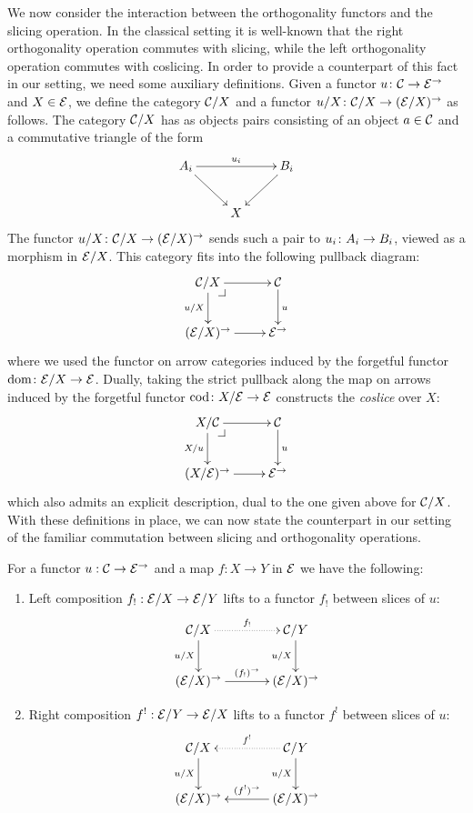 \documentclass[reqno,10pt,a4paper,oneside]{amsart}
\begin{document}
We now consider the interaction between the orthogonality functors and the slicing operation. In the classical setting it is well-known that the right orthogonality operation commutes with slicing, while the left orthogonality operation commutes with coslicing.  In order to provide a counterpart of this fact in our setting, we need some auxiliary definitions. Given a functor $u \co \cal{C} \to \catE^{\to}$ and $X \in \catE$, we define the category $\cal{C}/X$
and a functor $u/X \co \cal{C}/X \to (\cal{E}/X)^\to$ as follows. The category $\cal{C}/X$ has as objects pairs consisting of an object $a \in \cal{C}$ and a commutative triangle of the form
\[
\xymatrix{
A_i \ar[dr] \ar[rr]^{u_i} & & B_i \ar[dl] \\
 & X }
 \]
The functor $u/X \co \cal{C}/X \to (\cal{E}/X)^\to$ sends such a pair to $u_i \co A_i \to B_i$, viewed as a morphism in $\cal{E}/X$. This category fits into the
following pullback diagram:
\[
\xymatrix{
  \cal{C}/X
  \ar[r]
  \ar[d]_{u/X}
  \pullback{dr}
&
  \cal{C}
  \ar[d]^{u}
\\
  (\catE/X)^{\to}
  \ar[r]
&
  \catE^{\to}
}
\]
where we used the functor on arrow categories induced by the forgetful functor $\operatorname{dom} \co \catE/X \to \catE$.  Dually, taking the strict pullback along the map on arrows induced by the forgetful functor 
$\operatorname{cod} \co X/\cal{E} \to \catE$ constructs the \emph{coslice} over $X$:
\[
\xymatrix{
  X/\cal{C}
  \ar[r]
  \ar[d]_{X/u}
  \pullback{dr}
&
  \cal{C}
  \ar[d]^{u}
\\
  (X/\catE)^{\to}
  \ar[r]
&
  \catE^{\to}
}
\]
which also admits an explicit description, dual to the one given above for $\cal{C}/X$. With these definitions in place, we can now state the counterpart in our setting of the familiar commutation between slicing and orthogonality operations. 

\begin{proposition}
\label{slicing-2-functorial}
For a functor $u : \cal{C} \to \catE^{\to}$ and a map $f : X \to Y$ in $\catE$ we have the following:
\begin{enumerate}
\item
Left composition $f_! : \calE/X \to \calE/Y$ lifts to a functor $f_!$ between slices of $u$:
\[
\xymatrix@C+1em{
  \cal{C}/X
  \ar@{.>}[r]^-{f_!}
  \ar[d]_{u/X}
&
  \cal{C}/Y
  \ar[d]_{u/X}
\\
  (\calE/X)^{\to}
  \ar[r]^-{(f_!)^{\to}}
&
  (\calE/X)^{\to}
}
\]
\item
Right composition $f^! : \calE/Y \to \calE/X$ lifts to a functor $f^!$ between slices of $u$:
\[
\xymatrix@C+1em{
  \cal{C}/X
  \ar[d]_{u/X}
&
  \cal{C}/Y
  \ar@{.>}[l]_-{f^!}
  \ar[d]_{u/X}
\\
  (\calE/X)^{\to}
&
  (\calE/X)^{\to}
  \ar[l]_-{(f^!)^{\to}}
}
\]
\end{enumerate}
\end{proposition}
\end{document}
